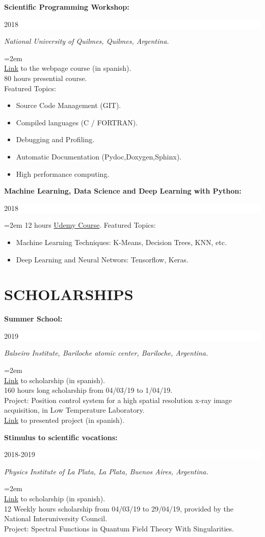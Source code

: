 \documentclass[paper=letter,fontsize=11pt]{scrartcl} %
\newcommand{\sepspace}{\vspace*{1em}}		%
\newcommand{\NewPart}[2]{\section*{\uppercase{#1} \small \normalfont #2}}
\newcommand{\EducationEntry}[4]{
		\noindent \textbf{#1} \hfill      %
		\colorbox{White}{%
			\parbox{6em}{%
			\hfill\color{Black}#2}} \par  %
		\noindent \textit{#3} \par        %
		\noindent\hangindent=2em\hangafter=0 \small #4 %
		\normalsize \par}
\begin{document}
\EducationEntry{Scientific Programming Workshop:
}{2018}{National University of Quilmes, Quilmes, Argentina.}{\\
{\href{https://wtpc.github.io/}{Link}} to the webpage course (in spanish).\\
80 hours presential course.\\
Featured Topics:



\begin{itemize}
	\item{Source Code Management (GIT).}
	\item{Compiled languages (C / FORTRAN).}
	\item{Debugging and Profiling.}
	\item{Automatic Documentation (Pydoc,Doxygen,Sphinx).}
	\item{High performance computing.}
	\end{itemize}}
\sepspace

\EducationEntry{Machine Learning, Data Science and Deep Learning with Python:
}{2018}{}{
12 hours {\href{https://www.udemy.com/data-science-and-machine-learning-with-python-hands-on/}{Udemy Course}}.
Featured Topics:
\begin{itemize}
\item{Machine Learning Techniques: K-Means, Decision Trees, KNN, etc. }
\item{Deep Learning and Neural Networs: Tensorflow, Keras.}
\end{itemize}
}


\sepspace

\NewPart{Scholarships}{}

\EducationEntry{Summer School:}
{2019}
{Balseiro Institute, Bariloche atomic center, Bariloche, Argentina.}{\\
{\href{http://www.ib.edu.ar/component/k2/item/452-becas-de-verano.html}{Link}} to scholarship (in spanish).
\\ 160 hours long scholarship from 04/03/19 to 1/04/19. \\ 
Project: Position control system for a high spatial resolution x-ray image acquisition, in Low Temperature Laboratory.\\
{\href{https://drive.google.com/drive/folders/1y01BjDnIPS2QOX3Vo68r9A8HA9tstj1S}{Link}} to presented project (in spanish).
}

\sepspace

\EducationEntry{Stimulus to scientific vocations:}
{2018-2019}
{Physics Institute of La Plata, La Plata, Buenos Aires, Argentina.}
{\\
{\href{http://evc.cin.edu.ar/}{Link}} to scholarship (in spanish).
\\ 12 Weekly hours scholarship from 04/03/19 to 29/04/19, provided by the National Interuniversity Council. \\ 
Project: Spectral Functions in Quantum Field Theory With Singularities.
}
\end{document}
